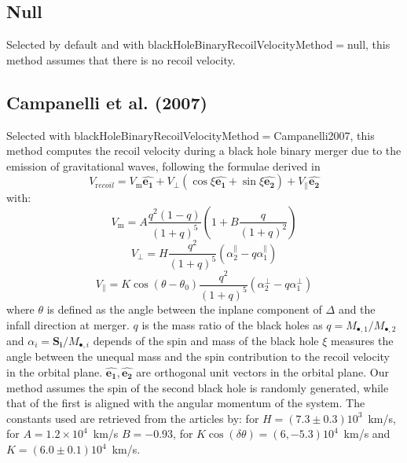 \subsection{Null}

Selected by default and with {\normalfont \ttfamily blackHoleBinaryRecoilVelocityMethod}$=${\normalfont \ttfamily null}, this method assumes that there is no recoil velocity.

\subsection{Campanelli et al. (2007)}

Selected with {\normalfont \ttfamily blackHoleBinaryRecoilVelocityMethod}$=${\normalfont \ttfamily Campanelli2007}, this method computes the recoil velocity during a black hole binary merger due to the emission of gravitational waves, following the formulae derived in \cite {campanelli_large_2007}
\begin{equation}
V_{\mathrm recoil}=V_{\mathrm m}\mathbf{\hat{e_1}}+V_\perp(\cos\xi\mathbf{\hat{e_1}}+\sin\xi\mathbf{\hat{e_2}})+V_\parallel\mathbf{\hat{e_2}} 
\end{equation}
with:
\begin{equation}
V_{\mathrm m}=A\frac{q^2(1-q)}{(1+q)^5}(1+B\frac{q}{(1+q)^2})
\end{equation}
\begin{equation}
V_\perp=H\frac{q^2}{(1+q)^5}(\alpha^\parallel_2-q\alpha^\parallel_1)
\end{equation}
\begin{equation}
V_\parallel=K\cos(\theta-\theta_0)\frac{q^2}{(1+q)^5}(\alpha^\perp_2-q\alpha^\perp_1)
\end{equation}
where $\theta$ is defined as the angle between the inplane \gls{component} of $\Delta$ and the infall direction at merger. $q$ is the mass ratio of the black holes as $q=M_{\bullet,1}/M_{\bullet,2}$ and $\alpha_i=\mathbf{S_i}/M_{\bullet,i}$ depends of the spin and mass of the black hole $\xi$ measures the angle between the unequal mass and the spin contribution to the recoil velocity in the orbital plane. $\mathbf{\hat{e_1}} , \mathbf{\hat{e_2}}$ are orthogonal unit vectors in the orbital plane. Our method assumes the spin of the second black hole is randomly generated, while that of the first is aligned with the angular momentum of the system. The constants used are retrieved from the articles by: \cite{koppitz_recoil_2007} for $H=(7.3\pm 0.3)10^3$~km/s, \cite{gonzalez_maximum_2007} for $A=1.2 \times 10^4$~km/s $B=-0.93$, \cite{gonzalez_supermassive_2007} for $K\cos(\delta\theta)=(6,-5.3)10^4$~km/s and $K=(6.0\pm 0.1)10^4$~km/s.

